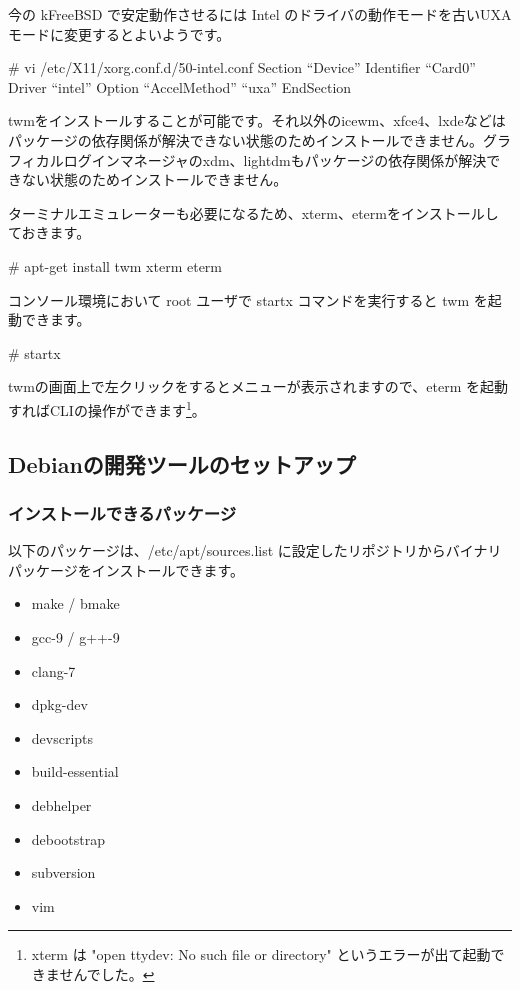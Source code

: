 \documentclass[mingoth,a4paper]{jsarticle}
\begin{document}
今の kFreeBSD で安定動作させるには Intel のドライバの動作モードを古いUXAモードに変更するとよいようです。

\begin{commandline}
# vi /etc/X11/xorg.conf.d/50-intel.conf
Section ``Device''
  Identifier  ``Card0''
  Driver      ``intel''
  Option      ``AccelMethod''  ``uxa''
EndSection
\end{commandline}



twmをインストールすることが可能です。それ以外のicewm、xfce4、lxdeなどはパッケージの依存関係が解決できない状態のためインストールできません。グラフィカルログインマネージャのxdm、lightdmもパッケージの依存関係が解決できない状態のためインストールできません。

ターミナルエミュレーターも必要になるため、xterm、etermをインストールしておきます。

\begin{commandline}
# apt-get install twm xterm eterm
\end{commandline}

コンソール環境において root ユーザで startx コマンドを実行すると twm を起動できます。

\begin{commandline}
# startx
\end{commandline}

twmの画面上で左クリックをするとメニューが表示されますので、eterm を起動すればCLIの操作ができます\footnote{xterm は "open ttydev: No such file or directory" というエラーが出て起動できませんでした。}。


\subsection{Debianの開発ツールのセットアップ}

\subsubsection{インストールできるパッケージ}

以下のパッケージは、/etc/apt/sources.list に設定したリポジトリからバイナリパッケージをインストールできます。

\begin{itemize}
\item make / bmake
\item gcc-9 / g++-9
\item clang-7
\item dpkg-dev
\item devscripts
\item build-essential
\item debhelper
\item debootstrap
\item subversion
\item vim
\end{itemize}
\end{document}
